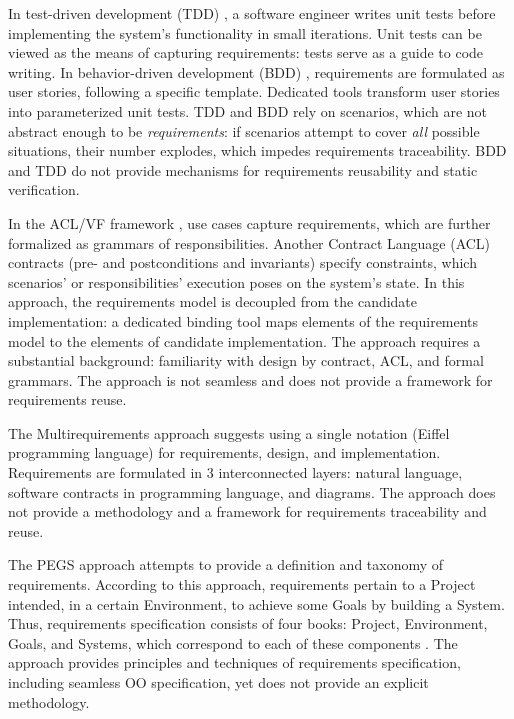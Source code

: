 In test-driven development (TDD) \cite{66}, a software engineer writes unit tests before implementing the system’s functionality in small iterations. Unit tests can be viewed as the means of capturing requirements: tests serve as a guide to code writing. In behavior-driven development (BDD) \cite{75, 86}, requirements are formulated as user stories, following a specific template. Dedicated tools transform user stories into parameterized unit tests. TDD and BDD rely on scenarios, which are not abstract enough to be \textit{requirements}: if scenarios attempt to cover \textit{all} possible situations, their number explodes, which impedes requirements traceability. BDD and TDD do not provide mechanisms for requirements reusability and static verification.
   
In the ACL/VF framework \cite{6, 64}, use cases capture requirements, which are further formalized as grammars of responsibilities. Another Contract Language (ACL) contracts (pre- and postconditions and invariants) specify constraints, which scenarios' or responsibilities' execution poses on the system's state. In this approach, the requirements model is decoupled from the candidate implementation: a dedicated binding tool maps elements of the requirements model to the elements of candidate implementation. The approach requires a substantial background: familiarity with design by contract, ACL, and formal grammars. The approach is not seamless and does not provide a framework for requirements reuse.

The Multirequirements approach \cite{32} suggests using a single notation (Eiffel programming language) for requirements, design, and implementation. Requirements are formulated in 3 interconnected layers: natural language, software contracts in programming language, and diagrams. The approach does not provide a methodology and a framework for requirements traceability and reuse.

The PEGS approach attempts to provide a definition and taxonomy of requirements. According to this approach, requirements pertain to a Project intended, in a certain Environment, to achieve some Goals by building a System. Thus, requirements specification consists of four books: Project, Environment, Goals, and Systems, which correspond to each of these components \cite{Handbook}. The approach provides principles and techniques of requirements specification, including seamless OO specification, yet does not provide an explicit methodology. 

